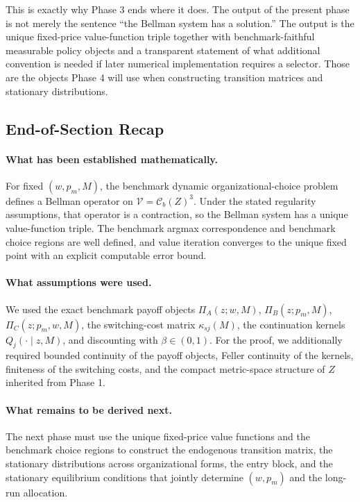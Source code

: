This is exactly why Phase 3 ends where it does. The output of the present phase is not merely the sentence ``the Bellman system has a solution.'' The output is the unique fixed-price value-function triple together with benchmark-faithful measurable policy objects and a transparent statement of what additional convention is needed if later numerical implementation requires a selector. Those are the objects Phase 4 will use when constructing transition matrices and stationary distributions.

\subsection{End-of-Section Recap}

\paragraph{What has been established mathematically.}
For fixed $(w,p_m,M)$, the benchmark dynamic organizational-choice problem defines a Bellman operator on $\mathcal V=\mathcal C_b(Z)^3$. Under the stated regularity assumptions, that operator is a contraction, so the Bellman system has a unique value-function triple. The benchmark argmax correspondence and benchmark choice regions are well defined, and value iteration converges to the unique fixed point with an explicit computable error bound.

\paragraph{What assumptions were used.}
We used the exact benchmark payoff objects $\Pi_A(z;w,M)$, $\Pi_B(z;p_m,M)$, $\Pi_C(z;p_m,w,M)$, the switching-cost matrix $\kappa_{sj}(M)$, the continuation kernels $Q_j(\cdot\mid z,M)$, and discounting with $\beta\in(0,1)$. For the proof, we additionally required bounded continuity of the payoff objects, Feller continuity of the kernels, finiteness of the switching costs, and the compact metric-space structure of $Z$ inherited from Phase 1.

\paragraph{What remains to be derived next.}
The next phase must use the unique fixed-price value functions and the benchmark choice regions to construct the endogenous transition matrix, the stationary distributions across organizational forms, the entry block, and the stationary equilibrium conditions that jointly determine $(w,p_m)$ and the long-run allocation.
